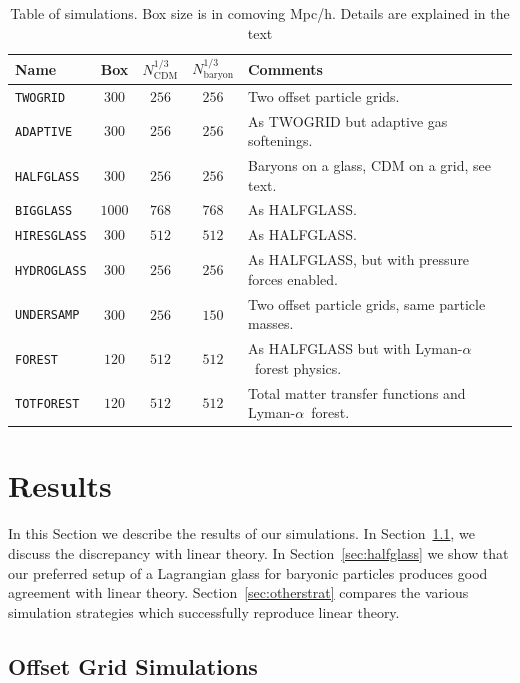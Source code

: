 \documentclass[a4paper,11pt]{article}
\newcommand{\Lya}{Lyman-$\alpha$}
\begin{document}
\begin{table}
\begin{center}
\begin{tabular}{|l|c|c|c|l|}
\hline
Name & Box & $N_\mathrm{CDM}^{1/3}$ & $N_\mathrm{baryon}^{1/3}$ & Comments  \\
\hline
\texttt{TWOGRID}    &   $300$ & $256$ & $256$ & Two offset particle grids. \\
\texttt{ADAPTIVE}    &   $300$ & $256$ & $256$ & As TWOGRID but adaptive gas softenings. \\
\texttt{HALFGLASS}  &   $300$ & $256$ & $256$ & Baryons on a glass, CDM on a grid, see text. \\
\texttt{BIGGLASS}  &   $1000$ & $768$ & $768$ & As HALFGLASS. \\
\texttt{HIRESGLASS}  &   $300$ & $512$ & $512$ & As HALFGLASS. \\
\texttt{HYDROGLASS}  &   $300$ & $256$ & $256$ & As HALFGLASS, but with pressure forces enabled. \\
\texttt{UNDERSAMP}  &   $300$ & $256$ & $150$ & Two offset particle grids, same particle masses. \\
\texttt{FOREST}  &   $120$ & $512$ & $512$ & As HALFGLASS but with \Lya~forest physics. \\
\texttt{TOTFOREST}  &   $120$ & $512$ & $512$ & Total matter transfer functions and \Lya~forest. \\
\hline
\end{tabular}
\end{center}
\caption{Table of simulations. Box size is in comoving Mpc/h. Details are explained in the text}
\label{tab:simulations}
\end{table}

\section{Results}
\label{sec:results}

In this Section we describe the results of our simulations. In Section~\ref{sec:offsetgrid}, we discuss the discrepancy with linear theory. In Section~\ref{sec:halfglass} we show that our preferred setup of a Lagrangian glass for baryonic particles produces good agreement with linear theory. Section~\ref{sec:otherstrat} compares the various simulation strategies which successfully reproduce linear theory.

\subsection{Offset Grid Simulations}
\label{sec:offsetgrid}
\end{document}
